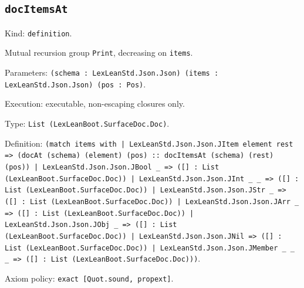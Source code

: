 \documentclass[11pt]{article}
\begin{document}
\subsection*{\texttt{docItemsAt}}
\noindent Kind: \texttt{definition}.\par
\noindent Mutual recursion group \texttt{Print}, decreasing on \texttt{items}.\par
\noindent Parameters: \texttt{(schema : LexLeanStd.Json.Json) (items : LexLeanStd.Json.Json) (pos : Pos)}.\par
\noindent Execution: executable, non-escaping closures only.\par
\noindent Type: \texttt{List (LexLeanBoot.SurfaceDoc.Doc)}.\par
\noindent Definition: \texttt{(match items with | LexLeanStd.Json.Json.JItem element rest => (docAt (schema) (element) (pos) :: docItemsAt (schema) (rest) (pos)) | LexLeanStd.Json.Json.JBool \_ => ([] : List (LexLeanBoot.SurfaceDoc.Doc)) | LexLeanStd.Json.Json.JInt \_ \_ => ([] : List (LexLeanBoot.SurfaceDoc.Doc)) | LexLeanStd.Json.Json.JStr \_ => ([] : List (LexLeanBoot.SurfaceDoc.Doc)) | LexLeanStd.Json.Json.JArr \_ => ([] : List (LexLeanBoot.SurfaceDoc.Doc)) | LexLeanStd.Json.Json.JObj \_ => ([] : List (LexLeanBoot.SurfaceDoc.Doc)) | LexLeanStd.Json.Json.JNil => ([] : List (LexLeanBoot.SurfaceDoc.Doc)) | LexLeanStd.Json.Json.JMember \_ \_ \_ => ([] : List (LexLeanBoot.SurfaceDoc.Doc)))}.\par
\noindent Axiom policy: \texttt{exact [Quot.sound, propext]}.\par
\end{document}
